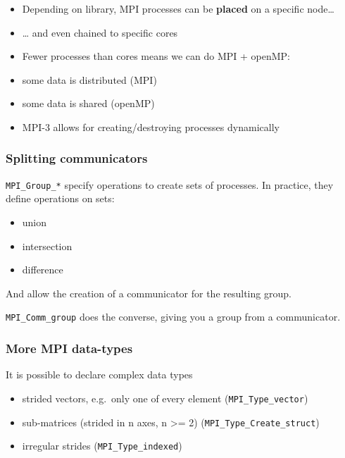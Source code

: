 \begin{itemize}
\itemsep1pt\parskip0pt
\item
  Depending on library, MPI processes can be \textbf{placed} on a
  specific node\ldots{}
\item
  \ldots{} and even chained to specific cores
\item
  Fewer processes than cores means we can do MPI + openMP:
\item
  some data is distributed (MPI)
\item
  some data is shared (openMP)
\item
  MPI-3 allows for creating/destroying processes dynamically
\end{itemize}

\subsubsection{Splitting communicators}\label{splitting-communicators}

\texttt{MPI\_Group\_*} specify operations to create sets of processes.
In practice, they define operations on sets:

\begin{itemize}
\itemsep1pt\parskip0pt
\item
  union
\item
  intersection
\item
  difference
\end{itemize}

And allow the creation of a communicator for the resulting group.

\texttt{MPI\_Comm\_group} does the converse, giving you a group from a
communicator.

\subsubsection{More MPI data-types}\label{more-mpi-data-types}

It is possible to declare complex data types

\begin{itemize}
\itemsep1pt\parskip0pt
\item
  strided vectors, e.g.~only one of every element
  (\texttt{MPI\_Type\_vector})
\item
  sub-matrices (strided in n axes, n \textgreater{}= 2)
  (\texttt{MPI\_Type\_Create\_struct})
\item
  irregular strides (\texttt{MPI\_Type\_indexed})
\end{itemize}

